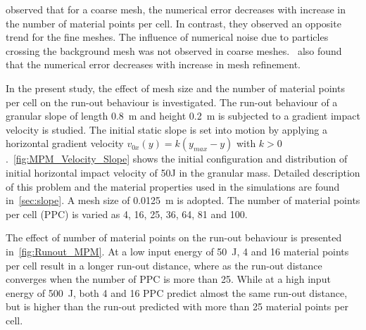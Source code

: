 \citet{Abe2013} observed that for a coarse mesh, the numerical error 
decreases with increase in the number of material points per cell. In contrast, 
they observed an opposite trend for the fine meshes. The influence of numerical 
noise due to particles crossing the background mesh was not observed in coarse 
meshes.~\citet{Coetzee2005} also found that the numerical error decreases 
with increase in mesh refinement.

In the present study, the effect of mesh size and the number of material points 
per cell on the run-out behaviour is investigated. The run-out behaviour of  a 
granular slope of length 0.8~\si{\m} and height 0.2~\si{\m} is subjected to a 
gradient impact velocity is studied. The initial 
static slope is set into motion by applying a horizontal
gradient velocity $v_{0x}(y) = k (y_{max} - y)$ with 
$k>0$.~\cref{fig:MPM_Velocity_Slope} shows the initial configuration and 
distribution of initial horizontal impact velocity of 50J in the granular mass. 
Detailed description of this problem and the material properties used in the 
simulations are found in~\cref{sec:slope}.
A mesh size of 0.0125~\si{\m} is adopted. The number of material points per 
cell (PPC) is varied as 4, 16, 25, 36, 64, 81 and 100.

The effect of number of material points on the run-out 
behaviour is presented in~\cref{fig:Runout_MPM}. At a low input energy of 
50~\si{\J}, 4 and 16 material points per cell result in a longer run-out 
distance, where as the 
run-out distance converges when the number of PPC is more 
than 25. While at a high input energy of 500~\si{J}, both 4 and 16 PPC predict 
almost the same run-out distance, but is higher than the run-out predicted 
with more than 25 material points per cell. 

